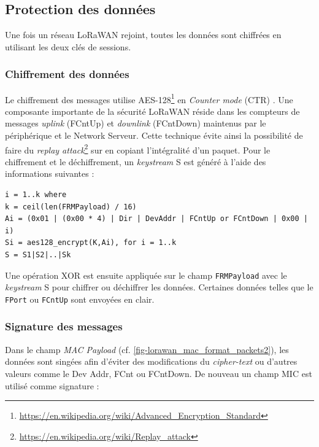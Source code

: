 \subsection{Protection des données}

Une fois un réseau LoRaWAN rejoint, toutes les données sont chiffrées en utilisant les deux clés de sessions.

\subsubsection{Chiffrement des données}

Le chiffrement des messages utilise AES-128\footnote{\url{https://en.wikipedia.org/wiki/Advanced_Encryption_Standard}} en \textit{Counter mode} (CTR) \cite{LoRaSecu3:online}. Une composante importante de la sécurité LoRaWAN réside dans les compteurs de messages \textit{uplink} (FCntUp) et \textit{downlink} (FCntDown) maintenus par le périphérique et le Network Serveur. Cette technique évite ainsi la possibilité de faire du \textit{replay attack}\footnote{\url{https://en.wikipedia.org/wiki/Replay_attack}} sur en copiant l'intégralité d'un paquet. 
Pour le chiffrement et le déchiffrement, un \textit{keystream} S est généré à l'aide des informations suivantes :

\begin{tcolorbox}[top=-3mm, bottom=-3mm, left=0mm, right=0mm, enhanced, breakable, colback=LightGray, colframe=DarkGray, colbacktitle=DarkGray]
\begin{verbatim}
i = 1..k where
k = ceil(len(FRMPayload) / 16)
Ai = (0x01 | (0x00 * 4) | Dir | DevAddr | FCntUp or FCntDown | 0x00 | i)
Si = aes128_encrypt(K,Ai), for i = 1..k
S = S1|S2|..|Sk
\end{verbatim}
\end{tcolorbox}

Une opération XOR est ensuite appliquée sur le champ \texttt{FRMPayload} avec le \textit{keystream} S pour chiffrer ou déchiffrer les données. Certaines données telles que le \texttt{FPort} ou \texttt{FCntUp} sont envoyées en clair.

\subsubsection{Signature des messages}

Dans le champ \textit{MAC Payload} (cf. \cref{fig-lorawan_mac_format_packets2}), les données sont singées afin d'éviter des modifications du \textit{cipher-text} ou d'autres valeurs comme le Dev Addr, FCnt ou FCntDown. De nouveau un champ MIC est utilisé comme signature :


